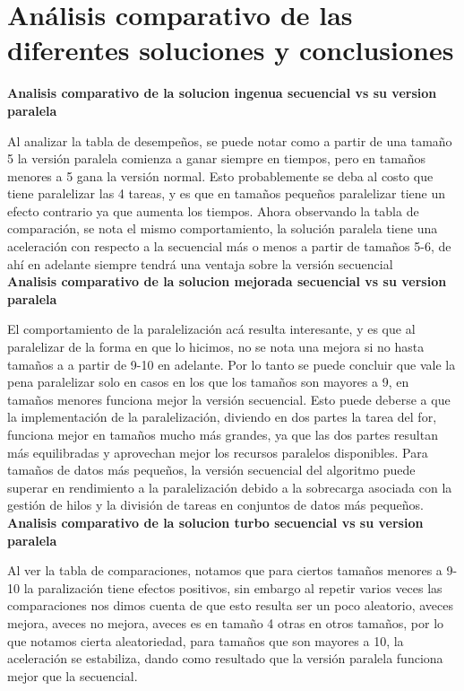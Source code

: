 \documentclass[conference]{IEEEtran}
\begin{document}
\section{\textbf{Análisis comparativo de las diferentes soluciones y conclusiones}}



\textbf{Analisis comparativo de la solucion ingenua secuencial vs su version paralela}

Al analizar la tabla de desempeños, se puede notar como a partir de una tamaño 5 la versión paralela comienza a ganar siempre en tiempos, pero en tamaños menores a 5 gana la versión normal. Esto probablemente se deba al costo que tiene paralelizar las 4 tareas, y es que en tamaños pequeños paralelizar tiene un efecto contrario ya que aumenta los tiempos. Ahora observando la tabla de comparación, se nota el mismo comportamiento, la solución paralela tiene una aceleración con respecto a la secuencial más o menos a partir de tamaños 5-6, de ahí en adelante siempre tendrá una ventaja sobre la versión secuencial\\


\textbf{Analisis comparativo de la solucion mejorada secuencial vs su version paralela}

El comportamiento de la paralelización acá resulta interesante, y es que al paralelizar de la forma en que lo hicimos, no se nota una mejora si no hasta tamaños a a partir de 9-10 en adelante. Por lo tanto se puede concluir que vale la pena paralelizar solo en casos en los que los tamaños son mayores a 9, en tamaños menores funciona mejor la versión secuencial. Esto puede deberse a que la implementación de la paralelización, diviendo en dos partes la tarea del for, funciona mejor en tamaños mucho más grandes, ya que las dos partes resultan más equilibradas y aprovechan mejor los recursos paralelos disponibles. Para tamaños de datos más pequeños, la versión secuencial del algoritmo puede superar en rendimiento a la paralelización debido a la sobrecarga asociada con la gestión de hilos y la división de tareas en conjuntos de datos más pequeños.\\


\textbf{Analisis comparativo de la solucion turbo secuencial vs su version paralela}

Al ver la tabla de comparaciones, notamos que para ciertos tamaños menores a 9-10 la paralización tiene efectos positivos, sin embargo al repetir varios veces las comparaciones nos dimos cuenta de que esto resulta ser un poco aleatorio, aveces mejora, aveces no mejora, aveces es en tamaño 4 otras en otros tamaños, por lo que notamos cierta aleatoriedad, para tamaños que son mayores a 10, la aceleración se estabiliza, dando como resultado que la versión paralela funciona mejor que la secuencial.\\
\end{document}
